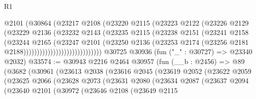 \begin{lexlean}{R1}
\begin{coremodule}
                                @2101
                                (@30864
                                  (@23217
                                    @2108
                                    (@23220
                                      @2115
                                      (@23223
                                        @2122
                                        (@23226
                                          @2129
                                          (@23229
                                            @2136
                                            (@23232
                                              @2143
                                              (@23235
                                                @2115
                                                (@23238
                                                  @2151
                                                  (@23241
                                                    @2158
                                                    (@23244
                                                      @2165
                                                      (@23247
                                                        @2101
                                                        (@23250
                                                          @2136
                                                          (@23253
                                                            @2174
                                                            (@23256
                                                              @2181
                                                              @2188)))))))))))))))))))))))))))))
    @30725
    @30936
    (fun ("_" : @30727) => @23340 @2032)
@33574 := @30943
    @2216
    @2464
    @30957
    (fun (__b : @2456) =>
    @89
      (@3682
        (@30961
          (@23613
            @2038
            (@23616
              @2045
              (@23619
                @2052
                (@23622
                  @2059
                  (@23625
                    @2066
                    (@23628
                      @2073
                      (@23631
                        @2080
                        (@23634
                          @2087
                          (@23637
                            @2094
                            (@23640
                              @2101
                              (@30972
                                (@23646
                                  @2108
                                  (@23649
                                    @2115

\end{coremodule}
\end{lexlean}
